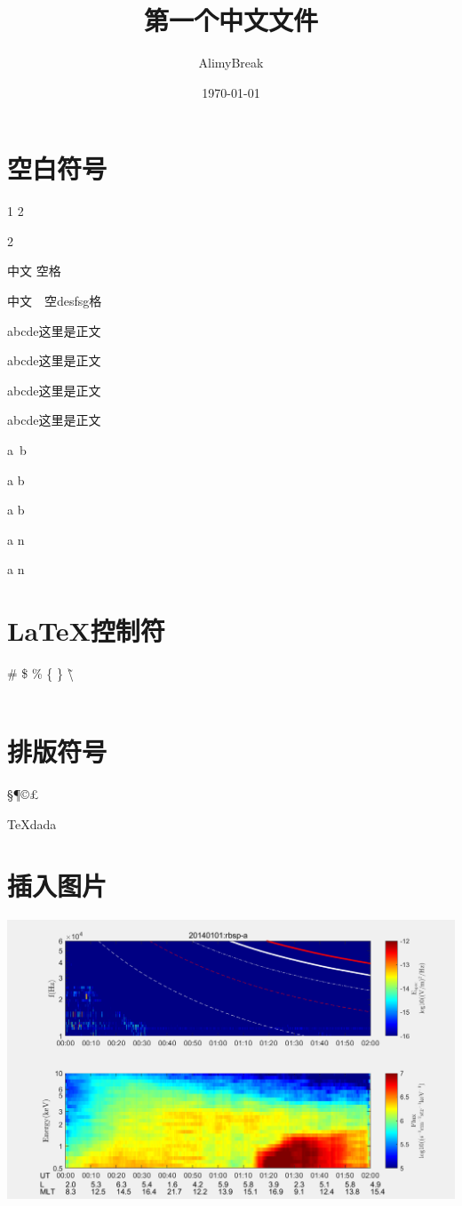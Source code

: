 \documentclass{article}  %
\title{第一个中文文件}
\author{\kaishu AlimyBreak}
\date{\today}
\begin{document}
\maketitle
\tableofcontents

\section{空白符号}
% 
1 2

2

中文   空格

中文\ \ 空desfsg格

abcde\quad 这里\quad 是正文

abcde\qquad 这里\qquad 是正文

abcde\thinspace 这里\thinspace 是正文

abcde\enspace 这里\enspace 是正文

a~b

a \kern 1pc b 

a \kern -1pc b 


a \hspace{35pt} n

a \hfill n

\section{\LaTeX 控制符}
\# \$ \% \{ \} \~ \textbackslash \\\\

\section{排版符号}
\S \P \dag \ddag \copyright \pounds


\TeX{dada}


\section{插入图片}
\graphicspath{{figure/}}
\includegraphics[scale=0.5]{rbsp-a20140101T000000.png}
\end{document}
